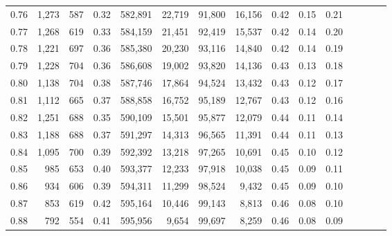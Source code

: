 \begin{tabular}{rrrcrrrrrrrrrrr}
0.76 &   1,273 &    587 &                                       0.32 &  582,891 &   22,719 &   91,800 &   16,156 &  0.42 &  0.15 &                         0.21 \\
0.77 &   1,268 &    619 &                                       0.33 &  584,159 &   21,451 &   92,419 &   15,537 &  0.42 &  0.14 &                         0.20 \\
0.78 &   1,221 &    697 &                                       0.36 &  585,380 &   20,230 &   93,116 &   14,840 &  0.42 &  0.14 &                         0.19 \\
0.79 &   1,228 &    704 &                                       0.36 &  586,608 &   19,002 &   93,820 &   14,136 &  0.43 &  0.13 &                         0.18 \\
0.80 &   1,138 &    704 &                                       0.38 &  587,746 &   17,864 &   94,524 &   13,432 &  0.43 &  0.12 &                         0.17 \\
0.81 &   1,112 &    665 &                                       0.37 &  588,858 &   16,752 &   95,189 &   12,767 &  0.43 &  0.12 &                         0.16 \\
0.82 &   1,251 &    688 &                                       0.35 &  590,109 &   15,501 &   95,877 &   12,079 &  0.44 &  0.11 &                         0.14 \\
0.83 &   1,188 &    688 &                                       0.37 &  591,297 &   14,313 &   96,565 &   11,391 &  0.44 &  0.11 &                         0.13 \\
0.84 &   1,095 &    700 &                                       0.39 &  592,392 &   13,218 &   97,265 &   10,691 &  0.45 &  0.10 &                         0.12 \\
0.85 &     985 &    653 &                                       0.40 &  593,377 &   12,233 &   97,918 &   10,038 &  0.45 &  0.09 &                         0.11 \\
0.86 &     934 &    606 &                                       0.39 &  594,311 &   11,299 &   98,524 &    9,432 &  0.45 &  0.09 &                         0.10 \\
0.87 &     853 &    619 &                                       0.42 &  595,164 &   10,446 &   99,143 &    8,813 &  0.46 &  0.08 &                         0.10 \\
0.88 &     792 &    554 &                                       0.41 &  595,956 &    9,654 &   99,697 &    8,259 &  0.46 &  0.08 &                         0.09 \\

\end{tabular}
